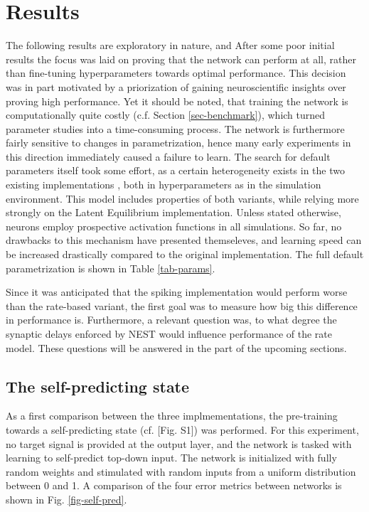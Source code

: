 
\chapter{Results}

The following results are exploratory in nature, and After some poor initial results the focus was laid on proving that
the network can perform at all, rather than fine-tuning hyperparameters towards optimal performance. This decision was
in part motivated by a priorization of gaining neuroscientific insights over proving high performance. Yet it should be
noted, that training the network is computationally quite costly (c.f. Section \ref{sec-benchmark}), which turned
parameter studies into a time-consuming process. The network is furthermore fairly sensitive to changes in
parametrization, hence many early experiments in this direction immediately caused a failure to learn. The search for
default parameters itself took some effort, as a certain heterogeneity exists in the two existing implementations
\citep{sacramento2018dendritic,Haider2021}, both in hyperparameters as in the simulation environment. This model
includes properties of both variants, while relying more strongly on the Latent Equilibrium implementation. Unless
stated otherwise, neurons employ prospective activation functions in all simulations. So far, no drawbacks to this
mechanism have presented themseleves, and learning speed can be increased drastically compared to the original
implementation. The full default parametrization is shown in Table \ref{tab-params}.

Since it was anticipated that the spiking implementation would perform worse than the rate-based variant, the first goal
was to measure how big this difference in performance is. Furthermore, a relevant question was, to what degree the
synaptic delays enforced by NEST would influence performance of the rate model. These questions will be answered in the
part of the upcoming sections.




\section{The self-predicting state}

As a first comparison between the three implmementations, the pre-training towards a self-predicting state (cf.
\cite{sacramento2018dendritic}[Fig. S1]) was performed. For this experiment, no target signal is provided at the output
layer, and the network is tasked with learning to self-predict top-down input. The network is initialized with fully
random weights and stimulated with random inputs from a uniform distribution between 0 and 1. A comparison of the four
error metrics between networks is shown in Fig. \ref{fig-self-pred}.



